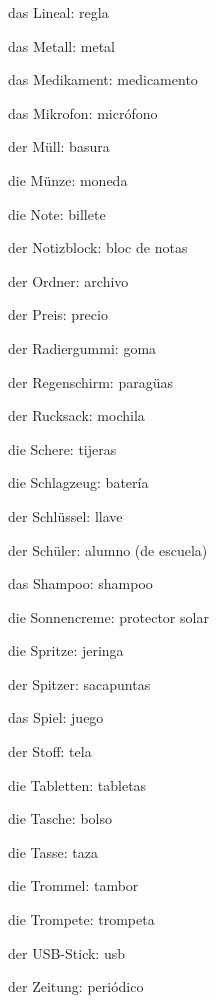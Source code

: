 \begin{multicols}{3}
\begin{myitemize}
\item das Lineal: regla
\item das Metall: metal
\item das Medikament: medicamento
\item das Mikrofon: micrófono
\item der Müll: basura
\item die Münze: moneda
\item die Note: billete
\item der Notizblock: bloc de notas
\item der Ordner: archivo
\item der Preis: precio
\item der Radiergummi: goma
\item der Regenschirm: paragüas
\item der Rucksack: mochila
\item die Schere: tijeras
\item die Schlagzeug: batería
\item der Schlüssel: llave
\item der Schüler: alumno (de escuela)
\item das Shampoo: shampoo
\item die Sonnencreme: protector solar
\item die Spritze: jeringa
\item der Spitzer: sacapuntas
\item das Spiel: juego
\item der Stoff: tela
\item die Tabletten: tabletas
\item die Tasche: bolso
\item die Tasse: taza
\item die Trommel: tambor
\item die Trompete: trompeta
\item der USB-Stick: usb
\item der Zeitung: periódico
\end{myitemize}
\end{multicols}

